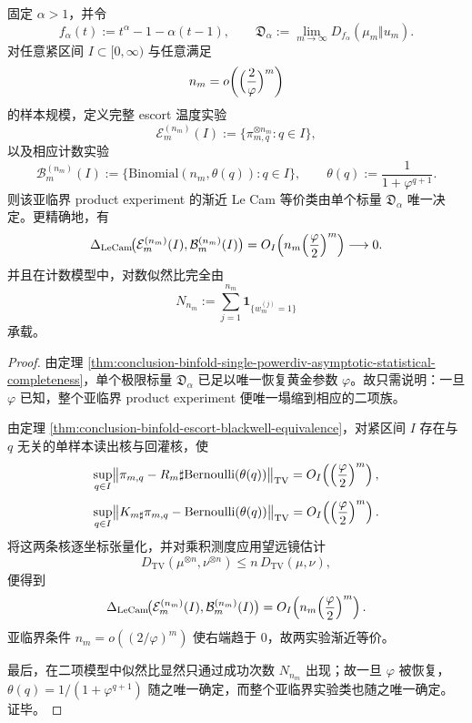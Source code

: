\begin{theorem}[单一幂散度标量生成整个亚临界统计实验类]\label{thm:conclusion-binfold-one-powerdiv-generates-subcritical-experiment-class}
固定 \(\alpha>1\)，并令
\[
f_\alpha(t):=t^\alpha-1-\alpha(t-1),
\qquad
\mathfrak D_\alpha:=\lim_{m\to\infty}D_{f_\alpha}(\mu_m\Vert u_m).
\]
对任意紧区间 \(I\subset[0,\infty)\) 与任意满足
\[
n_m=o\!\left(\Bigl(\frac{2}{\varphi}\Bigr)^m\right)
\]
的样本规模，定义完整 escort 温度实验
\[
\mathcal E_m^{(n_m)}(I):=\{\pi_{m,q}^{\otimes n_m}:q\in I\},
\]
以及相应计数实验
\[
\mathcal B_m^{(n_m)}(I):=
\bigl\{\mathrm{Binomial}(n_m,\theta(q)):q\in I\bigr\},
\qquad
\theta(q):=\frac{1}{1+\varphi^{q+1}}.
\]
则该亚临界 product experiment 的渐近 Le Cam 等价类由单个标量 \(\mathfrak D_\alpha\) 唯一决定。更精确地，有
\[
\Delta_{\mathrm{LeCam}}\!\bigl(\mathcal E_m^{(n_m)}(I),\mathcal B_m^{(n_m)}(I)\bigr)
=
O_I\!\left(n_m\Bigl(\frac{\varphi}{2}\Bigr)^m\right)
\longrightarrow 0.
\]
并且在计数模型中，对数似然比完全由
\[
N_{n_m}:=\sum_{j=1}^{n_m}\mathbf 1_{\{w_m^{(j)}=1\}}
\]
承载。
\end{theorem}
\begin{proof}
由定理 \ref{thm:conclusion-binfold-single-powerdiv-asymptotic-statistical-completeness}，单个极限标量 \(\mathfrak D_\alpha\) 已足以唯一恢复黄金参数 \(\varphi\)。故只需说明：一旦 \(\varphi\) 已知，整个亚临界 product experiment 便唯一塌缩到相应的二项族。

由定理 \ref{thm:conclusion-binfold-escort-blackwell-equivalence}，对紧区间 \(I\) 存在与 \(q\) 无关的单样本读出核与回灌核，使
\[
\sup_{q\in I}
\bigl\|
\pi_{m,q}-R_m\sharp\mathrm{Bernoulli}(\theta(q))
\bigr\|_{\mathrm{TV}}
=
O_I\!\left(\Bigl(\frac{\varphi}{2}\Bigr)^m\right),
\]
\[
\sup_{q\in I}
\bigl\|
K_{m\sharp}\pi_{m,q}-\mathrm{Bernoulli}(\theta(q))
\bigr\|_{\mathrm{TV}}
=
O_I\!\left(\Bigl(\frac{\varphi}{2}\Bigr)^m\right).
\]
将这两条核逐坐标张量化，并对乘积测度应用望远镜估计
\[
D_{\mathrm{TV}}(\mu^{\otimes n},\nu^{\otimes n})\le n\,D_{\mathrm{TV}}(\mu,\nu),
\]
便得到
\[
\Delta_{\mathrm{LeCam}}\!\bigl(\mathcal E_m^{(n_m)}(I),\mathcal B_m^{(n_m)}(I)\bigr)
=
O_I\!\left(n_m\Bigl(\frac{\varphi}{2}\Bigr)^m\right).
\]
亚临界条件 \(n_m=o((2/\varphi)^m)\) 使右端趋于 \(0\)，故两实验渐近等价。

最后，在二项模型中似然比显然只通过成功次数 \(N_{n_m}\) 出现；故一旦 \(\varphi\) 被恢复，\(\theta(q)=1/(1+\varphi^{q+1})\) 随之唯一确定，而整个亚临界实验类也随之唯一确定。证毕。
\end{proof}

